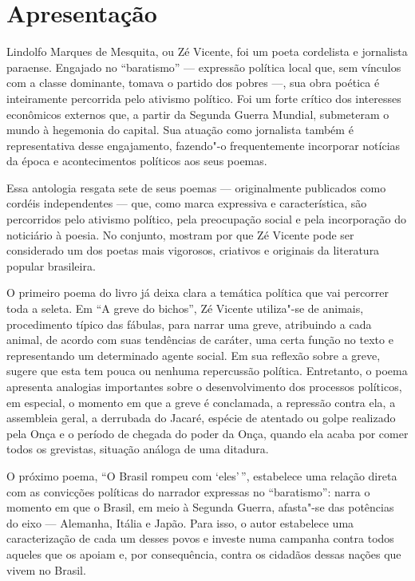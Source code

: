 \chapter{Apresentação}

Lindolfo Marques de Mesquita, ou Zé Vicente, foi um poeta cordelista e jornalista 
paraense. Engajado no ``baratismo'' --- expressão política local que, sem vínculos com a classe dominante, tomava o partido dos pobres ---, sua obra poética é inteiramente percorrida pelo ativismo político.
Foi um forte crítico dos interesses econômicos externos que, a partir da Segunda Guerra Mundial, submeteram o mundo à hegemonia do capital.
Sua atuação como jornalista também é representativa desse engajamento, fazendo"-o frequentemente incorporar notícias da época e acontecimentos políticos aos seus poemas.


Essa antologia resgata sete de seus poemas --- originalmente publicados como cordéis independentes --- que, como marca expressiva e característica, são percorridos pelo ativismo político, pela preocupação social e pela incorporação do noticiário à poesia.
No conjunto, mostram por que Zé Vicente pode ser considerado um dos poetas mais vigorosos, criativos e originais da literatura popular brasileira.

O primeiro poema do livro já deixa clara a temática política que vai percorrer toda a seleta. Em ``A greve do bichos'', Zé Vicente utiliza"-se de animais, procedimento típico das fábulas, para narrar uma greve, atribuindo a cada animal, de acordo com suas tendências de caráter, uma certa função no texto e representando um determinado agente social.
Em sua reflexão sobre a greve, sugere que esta tem pouca ou nenhuma repercussão política. Entretanto, o poema apresenta analogias importantes sobre o desenvolvimento dos processos
políticos, em especial, o momento em que a greve é conclamada, a
repressão contra ela, a assembleia geral, a derrubada do Jacaré,
espécie de atentado ou golpe realizado pela Onça e o período de chegada
do poder da Onça, quando ela acaba por comer todos os grevistas,
situação análoga de uma ditadura.

O próximo poema, ``O Brasil rompeu com `eles'\,'', estabelece uma relação direta com as convicções políticas do narrador expressas no ``baratismo'': narra o
momento em que o Brasil, em meio à Segunda Guerra, afasta"-se das
potências do eixo --- Alemanha, Itália e Japão. Para isso, o autor
estabelece uma caracterização de cada um desses povos e investe numa
campanha contra todos aqueles que os apoiam e, por consequência,
contra os cidadãos dessas nações que vivem no Brasil. 

